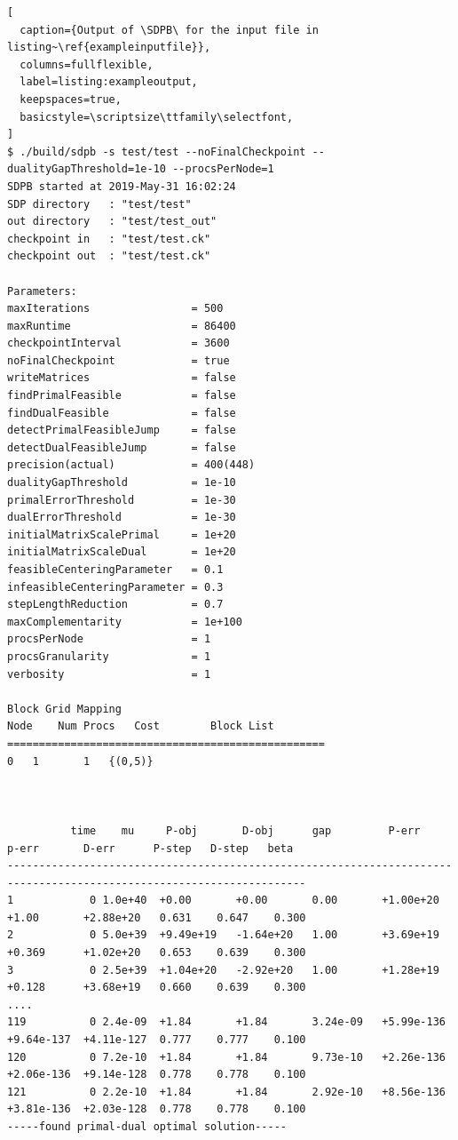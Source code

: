 \documentclass[12pt]{article}
\numberwithin{equation}{section}
\newcommand\SDPB{\texttt{SDPB}}
\begin{document}
\begin{lstlisting}[
  caption={Output of \SDPB\ for the input file in listing~\ref{exampleinputfile}},
  columns=fullflexible,
  label=listing:exampleoutput,
  keepspaces=true,
  basicstyle=\scriptsize\ttfamily\selectfont,
]
$ ./build/sdpb -s test/test --noFinalCheckpoint --dualityGapThreshold=1e-10 --procsPerNode=1
SDPB started at 2019-May-31 16:02:24
SDP directory   : "test/test"
out directory   : "test/test_out"
checkpoint in   : "test/test.ck"
checkpoint out  : "test/test.ck"

Parameters:
maxIterations                = 500
maxRuntime                   = 86400
checkpointInterval           = 3600
noFinalCheckpoint            = true
writeMatrices                = false
findPrimalFeasible           = false
findDualFeasible             = false
detectPrimalFeasibleJump     = false
detectDualFeasibleJump       = false
precision(actual)            = 400(448)
dualityGapThreshold          = 1e-10
primalErrorThreshold         = 1e-30
dualErrorThreshold           = 1e-30
initialMatrixScalePrimal     = 1e+20
initialMatrixScaleDual       = 1e+20
feasibleCenteringParameter   = 0.1
infeasibleCenteringParameter = 0.3
stepLengthReduction          = 0.7
maxComplementarity           = 1e+100
procsPerNode                 = 1
procsGranularity             = 1
verbosity                    = 1

Block Grid Mapping
Node	Num Procs	Cost		Block List
==================================================
0	1		1	{(0,5)}



          time    mu     P-obj       D-obj      gap         P-err       p-err       D-err      P-step   D-step   beta
---------------------------------------------------------------------------------------------------------------------
1            0 1.0e+40  +0.00       +0.00       0.00       +1.00e+20   +1.00       +2.88e+20   0.631    0.647    0.300
2            0 5.0e+39  +9.49e+19   -1.64e+20   1.00       +3.69e+19   +0.369      +1.02e+20   0.653    0.639    0.300
3            0 2.5e+39  +1.04e+20   -2.92e+20   1.00       +1.28e+19   +0.128      +3.68e+19   0.660    0.639    0.300
....
119          0 2.4e-09  +1.84       +1.84       3.24e-09   +5.99e-136  +9.64e-137  +4.11e-127  0.777    0.777    0.100
120          0 7.2e-10  +1.84       +1.84       9.73e-10   +2.26e-136  +2.06e-136  +9.14e-128  0.778    0.778    0.100
121          0 2.2e-10  +1.84       +1.84       2.92e-10   +8.56e-136  +3.81e-136  +2.03e-128  0.778    0.778    0.100
-----found primal-dual optimal solution-----


\end{lstlisting}
\end{document}
